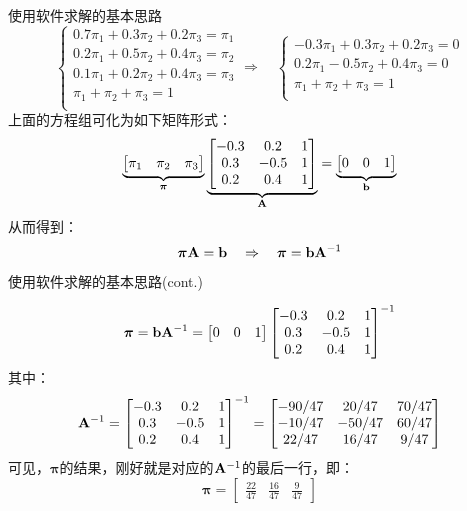 \documentclass[t]{beamer}
\begin{document}
\begin{frame}{使用软件求解的基本思路}
    \small  \[\begin{cases}
        0.7\pi_1+0.3\pi_2+0.2\pi_3=\pi_1\\
        0.2\pi_1+0.5\pi_2+0.4\pi_3=\pi_2\\
        0.1\pi_1+0.2\pi_2+0.4\pi_3=\pi_3\\
        \pi_1+\pi_2+\pi_3=1\\
        \end{cases}\Rightarrow \quad \begin{cases}
        -0.3\pi_1+0.3\pi_2+0.2\pi_3=0\\
        0.2\pi_1-0.5\pi_2+0.4\pi_3=0\\
        \pi_1+\pi_2+\pi_3=1\\
        \end{cases}\]
        上面的方程组可化为如下矩阵形式：
        \[\underbrace{\begin{bmatrix}
        \pi_1&\pi_2&\pi_3
        \end{bmatrix}}_{\bm\pi}\underbrace{\begin{bmatrix}
        -0.3& 0.2& 1\\
        0.3 &-0.5&1\\
        0.2& 0.4& 1
        \end{bmatrix}}_{\bf A}=\underbrace{\begin{bmatrix}
        0&0&1
        \end{bmatrix}}_{\bf b} \]
        从而得到：
        \[\bm{\pi}{\bf A}={\bf b}\quad \Rightarrow\quad \bm{\pi}={\bf b}{\bf A}^{-1} \]
    \end{frame}


    \begin{frame}{使用软件求解的基本思路(cont.)}
        \small
        
        
        \[\bm{\pi}={\bf b}{\bf A}^{-1}=\begin{bmatrix}
        0&0&1
        \end{bmatrix}\begin{bmatrix}
        -0.3& 0.2& 1\\
        0.3 &-0.5&1\\
        0.2& 0.4& 1
        \end{bmatrix}^{-1} \]
        其中：\[{\bf A}^{-1}=\begin{bmatrix}
        -0.3& 0.2& 1\\
        0.3 &-0.5&1\\
        0.2& 0.4& 1
        \end{bmatrix}^{-1}=\begin{bmatrix}
        -90/47& 20/47& 70/47\\
        -10/47& -50/47& 60/47\\
        22/47& 16/47& 9/47
        \end{bmatrix}\]
        可见，$\bm{\pi}$的结果，刚好就是对应的${\bf A}^{-1}$的最后一行，即：
        \[\bm{\pi}=\begin{bmatrix}
            \displaystyle\frac{22}{47} &\displaystyle\frac{16}{47}&\displaystyle\frac{9}{47}
        \end{bmatrix} \]
\end{frame}
\end{document}
